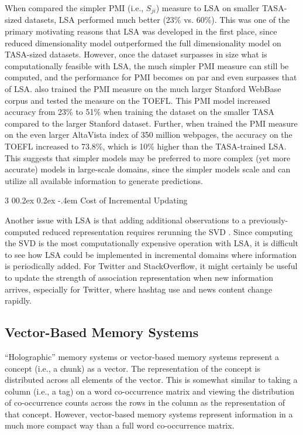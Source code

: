 \documentclass[man,floatsintext,donotrepeattitle]{apa6}
\makeatletter
\renewcommand{\subsubsection}{%
  \@startsection
  {subsubsection}%
  {3}%
  {\parindent}%
  {0\baselineskip \@plus 0.2ex \@minus 0.2ex}%
  {-.4em}%
  {\normalfont\normalsize\bfseries\addperi}}
\makeatother
\begin{document}
When \textcite{Budiu2007} compared the simpler PMI (i.e., $S_{ji}$) measure to LSA on smaller TASA-sized datasets, LSA performed much better (23\% vs. 60\%).
This was one of the primary motivating reasons that LSA was developed in the first place, since reduced dimensionality model outperformed the full dimensionality model on TASA-sized datasets.
However, once the dataset surpasses in size what is computationally feasible with LSA, the much simpler PMI measure can still be computed, and the performance for PMI becomes on par and even surpasses that of LSA.
\textcite{Budiu2007} also trained the PMI measure on the much larger Stanford WebBase corpus and tested the measure on the TOEFL.
This PMI model increased accuracy from 23\% to 51\% when training the dataset on the smaller TASA compared to the larger Stanford dataset.
Further, when \textcite{Turney2001} trained the PMI measure on the even larger AltaVista index of 350 million webpages, the accuracy on the TOEFL increased to \num{73.8}\%, which is 10\% higher than the TASA-trained LSA.
This suggests that simpler models may be preferred to more complex (yet more accurate) models in large-scale domains, since the simpler models scale and can utilize all available information to generate predictions.

\subsubsection{Cost of Incremental Updating}

Another issue with LSA is that adding additional observations to a previously-computed reduced representation requires rerunning the SVD \parencite{Farahat2004}.
Since computing the SVD is the most computationally expensive operation with LSA, it is difficult to see how LSA could be implemented in incremental domains where information is periodically added.
For Twitter and StackOverflow, it might certainly be useful to update the strength of association representation when new information arrives, especially for Twitter, where hashtag use and news content change rapidly.

\subsection{Vector-Based Memory Systems}

``Holographic'' memory systems \parencite{Plate1995} or vector-based memory systems represent a concept (i.e., a chunk) as a vector.
The representation of the concept is distributed across all elements of the vector.
This is somewhat similar to taking a column (i.e., a tag) on a word co-occurrence matrix and viewing the distribution of co-occurrence counts across the rows in the column as the representation of that concept.
However, vector-based memory systems represent information in a much more compact way than a full word co-occurrence matrix.
\end{document}
